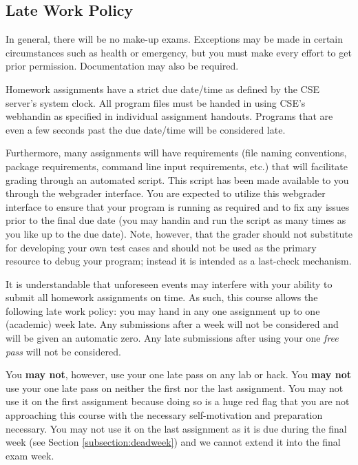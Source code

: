 \documentclass[12pt]{scrartcl}
\begin{document}
\subsection{Late Work Policy}

In general, there will be no make-up exams.  Exceptions may 
be made in certain circumstances such as health or emergency, 
but you must make every effort to get prior permission.  
Documentation may also be required.

Homework assignments have a strict due date/time as defined by
the CSE server's system clock.  All program files must be handed
in using CSE's webhandin as specified in individual assignment
handouts.  Programs that are even a few seconds past the due 
date/time will be considered late.  

Furthermore, many assignments will have requirements (file 
naming conventions, package requirements, command line input 
requirements, etc.) that will facilitate grading through an 
automated script.  This script has been made available to you 
through the webgrader interface.  You are expected to utilize 
this webgrader interface to ensure that your program is running 
as required and to fix any issues prior to the final due date 
(you may handin and run the script as many times as you like 
up to the due date).  Note, however, that the grader should 
not substitute for developing your own test cases and should 
not be used as the primary resource to debug your program; 
instead it is intended as a last-check mechanism.

It is understandable that unforeseen events may interfere 
with your ability to submit all homework assignments on time.  
As such, this course allows the following late work policy: 
you may hand in any one assignment up to one (academic) week 
late.  Any submissions after a week will not be considered 
and will be given an automatic zero.  Any late submissions 
after using your one \emph{free pass} will not be considered.

You \textbf{may not}, however, use your one late pass on any
lab or hack.  You \textbf{may not} use your one late pass on 
neither the first nor the last assignment.  You may not use it
on the first assignment because doing so is a huge red flag that
you are not approaching this course with the necessary 
self-motivation and preparation necessary.  You may not use
it on the last assignment as it is due during the final week
(see Section \ref{subsection:deadweek}) and we cannot extend
it into the final exam week.
\end{document}
